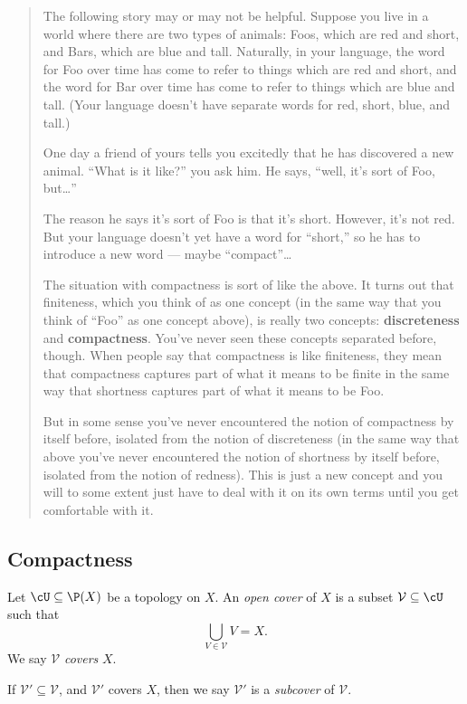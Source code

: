 \documentclass[a4paper]{article}
\begin{document}
\begin{quotation}
  The following story may or may not be helpful. Suppose you live in a world where there are two types of animals: Foos, which are red and short, and Bars, which are blue and tall. Naturally, in your language, the word for Foo over time has come to refer to things which are red and short, and the word for Bar over time has come to refer to things which are blue and tall. (Your language doesn't have separate words for red, short, blue, and tall.)

  One day a friend of yours tells you excitedly that he has discovered a new animal. ``What is it like?'' you ask him. He says, ``well, it's sort of Foo, but\ldots''

  The reason he says it's sort of Foo is that it's short. However, it's not red. But your language doesn't yet have a word for ``short,'' so he has to introduce a new word --- maybe ``compact''\ldots

  \separator

  The situation with compactness is sort of like the above. It turns out that finiteness, which you think of as one concept (in the same way that you think of ``Foo'' as one concept above), is really two concepts: \textbf{discreteness} and \textbf{compactness}. You've never seen these concepts separated before, though. When people say that compactness is like finiteness, they mean that compactness captures part of what it means to be finite in the same way that shortness captures part of what it means to be Foo.

  But in some sense you've never encountered the notion of compactness by itself before, isolated from the notion of discreteness (in the same way that above you've never encountered the notion of shortness by itself before, isolated from the notion of redness). This is just a new concept and you will to some extent just have to deal with it on its own terms until you get comfortable with it.
\end{quotation}

\subsection{Compactness}
\begin{defi}
  Let $\cU\subseteq \P(X)$ be a topology on $X$. An \emph{open cover} of $X$ is a subset $\mathcal{V}\subseteq \cU$ such that
  \[
    \bigcup_{V\in \mathcal{V}} V = X.
  \]
  We say $\mathcal{V}$ \emph{covers} $X$.

  If $\mathcal{V}'\subseteq \mathcal{V}$, and $\mathcal{V}'$ covers $X$, then we say $\mathcal{V}'$ is a \emph{subcover} of $\mathcal{V}$.
\end{defi}
\end{document}
